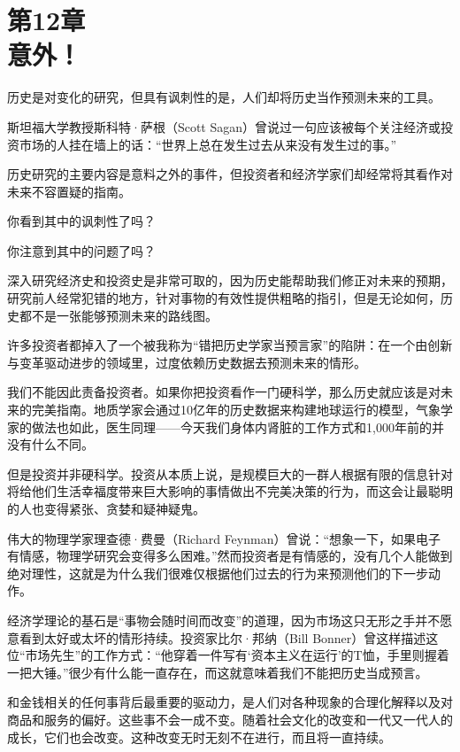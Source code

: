 
\section[第12章\q 意外！]{第12章\\ 意外！}

{\kaishu

历史是对变化的研究，但具有讽刺性的是，人们却将历史当作预测未来的工具。

}

斯坦福大学教授斯科特·萨根（Scott Sagan）曾说过一句应该被每个关注经济或投资市场的人挂在墙上的话：“世界上总在发生过去从来没有发生过的事。”

历史研究的主要内容是意料之外的事件，但投资者和经济学家们却经常将其看作对未来不容置疑的指南。

你看到其中的讽刺性了吗？

你注意到其中的问题了吗？

深入研究经济史和投资史是非常可取的，因为历史能帮助我们修正对未来的预期，研究前人经常犯错的地方，针对事物的有效性提供粗略的指引，但是无论如何，历史都不是一张能够预测未来的路线图。

许多投资者都掉入了一个被我称为“错把历史学家当预言家”的陷阱：在一个由创新与变革驱动进步的领域里，过度依赖历史数据去预测未来的情形。

我们不能因此责备投资者。如果你把投资看作一门硬科学，那么历史就应该是对未来的完美指南。地质学家会通过10亿年的历史数据来构建地球运行的模型，气象学家的做法也如此，医生同理——今天我们身体内肾脏的工作方式和1,000年前的并没有什么不同。

但是投资并非硬科学。投资从本质上说，是规模巨大的一群人根据有限的信息针对将给他们生活幸福度带来巨大影响的事情做出不完美决策的行为，而这会让最聪明的人也变得紧张、贪婪和疑神疑鬼。

伟大的物理学家理查德·费曼（Richard Feynman）曾说：“想象一下，如果电子有情感，物理学研究会变得多么困难。”然而投资者是有情感的，没有几个人能做到绝对理性，这就是为什么我们很难仅根据他们过去的行为来预测他们的下一步动作。

经济学理论的基石是“事物会随时间而改变”的道理，因为市场这只无形之手并不愿意看到太好或太坏的情形持续。投资家比尔·邦纳（Bill Bonner）曾这样描述这位“市场先生”的工作方式：“他穿着一件写有‘资本主义在运行’的T恤，手里则握着一把大锤。”很少有什么能一直存在，而这就意味着我们不能把历史当成预言。

和金钱相关的任何事背后最重要的驱动力，是人们对各种现象的合理化解释以及对商品和服务的偏好。这些事不会一成不变。随着社会文化的改变和一代又一代人的成长，它们也会改变。这种改变无时无刻不在进行，而且将一直持续。

